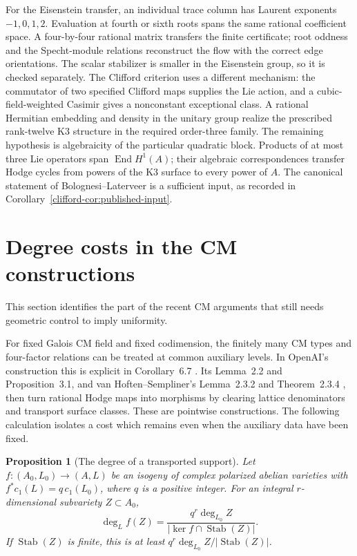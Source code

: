 \documentclass[11pt]{article}
\newtheorem{proposition}[theorem]{Proposition}
\theoremstyle{definition}
\theoremstyle{remark}
\begin{document}
For the Eisenstein transfer, an individual trace column has Laurent
exponents $-1,0,1,2$. Evaluation at fourth or sixth roots spans the
same rational coefficient space. A four-by-four rational matrix
transfers the finite certificate; root oddness and the Specht-module
relations reconstruct the flow with the correct edge orientations.
The scalar stabilizer is smaller in the Eisenstein group, so it is
checked separately. The Clifford criterion uses a different mechanism:
the commutator of two specified Clifford maps supplies the Lie action,
and a cubic-field-weighted Casimir gives a nonconstant exceptional
class. A rational Hermitian embedding and density in the unitary group
realize the prescribed rank-twelve K3 structure in the required
order-three family. The remaining hypothesis is algebraicity of the
particular quadratic block. Products of at most three Lie operators span
$\operatorname{End}H^1(A)$; their algebraic correspondences transfer
Hodge cycles from powers of the K3 surface to every power of $A$.
The canonical statement of Bolognesi--Laterveer is a sufficient input,
as recorded in Corollary~\ref{clifford-cor:published-input}.

\section{Degree costs in the CM constructions}
\label{sec:cm-cost}
This section identifies the part of the recent CM arguments that still needs geometric control to imply uniformity.

For fixed Galois CM field and fixed codimension, the finitely many CM types and four-factor relations can be treated at common auxiliary levels. In OpenAI's construction this is explicit in Corollary~6.7 \cite{OpenAICM}. Its Lemma~2.2 and Proposition~3.1, and van Hoften--Sempliner's Lemma~2.3.2 and Theorem~2.3.4 \cite{vHS}, then turn rational Hodge maps into morphisms by clearing lattice denominators and transport surface classes. These are pointwise constructions. The following calculation isolates a cost which remains even when the auxiliary data have been fixed.

\begin{proposition}[The degree of a transported support]\label{prop:transport}
Let $f:(A_0,L_0)\to(A,L)$ be an isogeny of complex polarized abelian varieties with $f^*c_1(L)=q\,c_1(L_0)$, where $q$ is a positive integer. For an integral $r$-dimensional subvariety $Z\subset A_0$,
\[
 \deg_L f(Z)=
 \frac{q^r\deg_{L_0}Z}
 {|\ker f\cap\operatorname{Stab}(Z)|}.
\]
If $\operatorname{Stab}(Z)$ is finite, this is at least
$q^r\deg_{L_0}Z/|\operatorname{Stab}(Z)|$.
\end{proposition}
\end{document}

